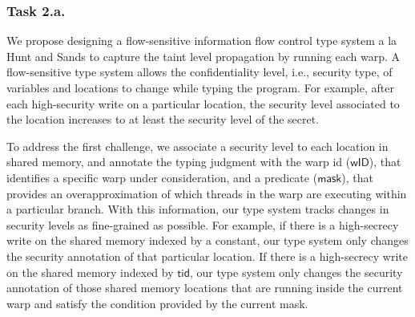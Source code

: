 \subsubsection{Task 2.a.} 
%
We propose designing a flow-sensitive information flow control type system a la Hunt and Sands\cite{hunt2006popl}  to capture the taint level propagation by running each warp.
%
A flow-sensitive type system allows the confidentiality level,
i.e., security type, of variables and locations to change while typing the program. 
%
For example, after each high-security write on a particular location, the security level associated to the location increases to at least the security level of the secret.
%
%

To address the first challenge, we associate a security level to each location in shared memory, and annotate the typing judgment with the warp id ($\mathsf{wID}$), that identifies a specific warp under consideration, and a predicate ($\mathsf{mask}$),  that provides an overapproximation of which threads in the warp are executing within a particular branch. 
% 
With this information, our type system tracks changes in security levels as fine-grained  as possible.
%
For example, if there is a high-secrecy write on the shared memory indexed by a constant, our type system only changes the security annotation of that particular location.
%
If there is a high-secrecy write on the shared memory indexed by $\mathsf{tid}$, our type system only changes the security annotation of those shared memory locations that are running inside the current warp and satisfy the condition provided by the current mask.

